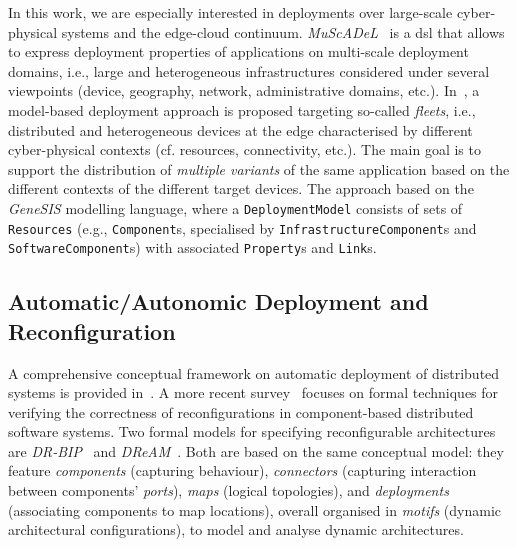 \documentclass[conference]{IEEEtran}
\newcommand{\meta}[1]{{\color{blue}#1}}
\begin{document}
In this work,
 we are especially interested in deployments over large-scale cyber-physical systems and the edge-cloud continuum.
%
\emph{MuScADeL}~\cite{DBLP:conf/compsac/BoujbelRLTAL14/muscadel}
 is a \ac{dsl} that allows to express deployment properties of 
applications on multi-scale deployment domains,
i.e., large and heterogeneous infrastructures considered under several viewpoints
(device, geography, network, administrative domains, etc.).
%
In~\cite{DBLP:journals/sosym/SongDFSF22},
  a model-based deployment approach is proposed
  targeting so-called \emph{fleets}, i.e.,
  distributed and heterogeneous devices at the edge characterised by different cyber-physical contexts
(cf. resources, connectivity, etc.).
%
The main goal is to support the distribution of \emph{multiple variants} of the same application based on the different contexts of the different target devices.
%
The approach based on the \emph{GeneSIS} modelling language,
where a \texttt{DeploymentModel} consists of sets of \texttt{Resources} (e.g., \texttt{Component}s, specialised by \texttt{InfrastructureComponent}s and \texttt{SoftwareComponent}s) with associated \texttt{Property}s and \texttt{Link}s.

\subsection{Automatic/Autonomic Deployment and Reconfiguration}
\label{sec:rw:autodep}
%
A comprehensive conceptual framework
 on automatic deployment of distributed systems
 is provided in~\cite{DBLP:journals/jss/ArcangeliBL15}.
%
A more recent survey~\cite{coullon2023swreconfig} focuses
 on formal techniques for verifying the correctness of reconfigurations
 in component-based distributed software systems.
%
Two formal models for specifying reconfigurable architectures are
\emph{DR-BIP}~\cite{Ballouli18dr-bip}
and \emph{DReAM}~\cite{denicola2020dream-dynamic-reconfig-arch-modelling}.
%
Both are based on the same conceptual model: they 
 feature \emph{components} (capturing behaviour),
\emph{connectors} (capturing interaction between components' \emph{ports}),
\emph{maps} (logical topologies),
and \emph{deployments} (associating components to map locations),
overall organised in \emph{motifs} (dynamic architectural configurations),
to model and analyse dynamic architectures.
%
\end{document}
